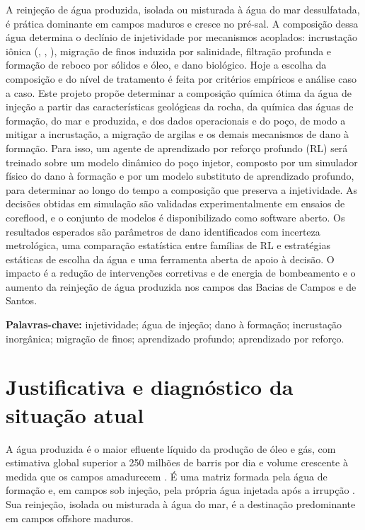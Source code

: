 \documentclass[11pt,a4paper]{article}
\newcommand{\itemedital}[1]{}
\begin{document}
A reinjeção de água produzida, isolada ou misturada à água do mar dessulfatada, é prática
dominante em campos maduros e cresce no pré-sal. A composição dessa água determina o
declínio de injetividade por mecanismos acoplados: incrustação iônica (,
, ), migração de finos induzida por salinidade, filtração profunda e
formação de reboco por sólidos e óleo, e dano biológico. Hoje a escolha da composição e do
nível de tratamento é feita por critérios empíricos e análise caso a caso. Este projeto
propõe determinar a composição química ótima da água de injeção a partir das
características geológicas da rocha, da química das águas de formação, do mar e
produzida, e dos dados operacionais e do poço, de modo a mitigar a incrustação, a
migração de argilas e os demais mecanismos de dano à formação. Para isso, um agente de
aprendizado por reforço profundo (RL) será treinado sobre um modelo dinâmico do poço
injetor, composto por um simulador físico do dano à formação e por um modelo substituto
de aprendizado profundo, para determinar ao longo do tempo a composição que preserva a
injetividade. As decisões obtidas em simulação são validadas experimentalmente em ensaios
de coreflood, e o conjunto de modelos é disponibilizado como software aberto. Os resultados esperados são parâmetros de dano identificados com
incerteza metrológica, uma comparação estatística entre famílias de RL e estratégias
estáticas de escolha da água e uma ferramenta aberta de apoio à decisão. O impacto é a
redução de intervenções corretivas e de energia de bombeamento e o aumento da reinjeção
de água produzida nos campos das Bacias de Campos e de Santos.

\noindent\textbf{Palavras-chave:} injetividade; água de injeção; dano à formação;
incrustação inorgânica; migração de finos; aprendizado profundo; aprendizado por reforço.

\section{Justificativa e diagnóstico da situação atual}\itemedital{2.16 VIII; Anexo 1 C}

A água produzida é o maior efluente líquido da produção de óleo e gás, com estimativa
global superior a 250 milhões de barris por dia e volume crescente à medida que os campos
amadurecem \cite{macedonio2014,elbadawy2021}. É uma matriz formada pela água de formação
e, em campos sob injeção, pela própria água injetada após a irrupção \cite{liang2018}. Sua
reinjeção, isolada ou misturada à água do mar, é a destinação predominante em campos
offshore maduros.
\end{document}
